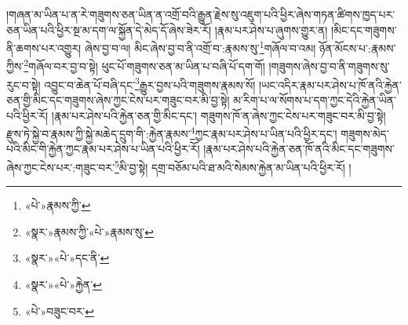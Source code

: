 །གཞན་མ་ཡིན་པ་ན་རེ་གཟུགས་ཅན་ཡིན་ན་འགྲོ་བའི་རྒྱུན་རྗེས་སུ་འཇུག་པའི་ཕྱིར་ཞེས་གཏན་ཚིགས་ཁྱད་པར་ཅན་ཡིན་པའི་ཕྱིར་སྔ་མ་དག་ལ་སྐྱོན་དེ་མེད་དོ་ཞེས་ཟེར་རོ། །རྣམ་པར་ཤེས་པ་ཞུགས་གྱུར་ན། །མིང་དང་གཟུགས་ནི་ཆགས་པར་འགྱུར། ཞེས་བྱ་བ་ལ། མིང་ཞེས་བྱ་བ་ནི་འགྲོ་བ་:རྣམས་སུ་\footnote{«པེ་»རྣམས་ཀྱི་}གཞོལ་བ་འམ། ཉོན་མོངས་པ་:རྣམས་ཀྱིས་\footnote{«སྣར་»རྣམས་ཀྱི་«པེ་»རྣམས་སུ་}གཞོལ་བར་བྱ་བ་སྟེ། ཕུང་པོ་གཟུགས་ཅན་མ་ཡིན་པ་བཞི་པོ་དག་གོ། །གཟུགས་ཞེས་བྱ་བ་ནི་གཟུགས་སུ་རུང་བ་སྟེ། འབྱུང་བ་ཆེན་པོ་བཞི་དང་\footnote{«སྣར་»«པེ་»དང་ནི་}རྒྱུར་བྱས་པའི་གཟུགས་རྣམས་སོ། །ཡང་འདིར་རྣམ་པར་ཤེས་པ་ཁོ་ནའི་རྐྱེན་ཅན་གྱི་མིང་དང་གཟུགས་ཞེས་ཀྱང་ངེས་པར་གཟུང་བར་མི་བྱ་སྟེ། མ་རིག་པ་ལ་སོགས་པ་དག་ཀྱང་དེའི་རྐྱེན་ཡིན་པའི་ཕྱིར་རོ། །རྣམ་པར་ཤེས་པའི་རྐྱེན་ཅན་གྱི་མིང་དང་། གཟུགས་ཁོ་ན་ཞེས་ཀྱང་ངེས་པར་གཟུང་བར་མི་བྱ་སྟེ། རྫུས་ཏེ་སྐྱེ་བ་རྣམས་ཀྱི་སྐྱེ་མཆེད་དྲུག་གི་:རྐྱེན་རྣམས་\footnote{«སྣར་»«པེ་»རྐྱེན་}ཀྱང་རྣམ་པར་ཤེས་པ་ཡིན་པའི་ཕྱིར་དང་། གཟུགས་མེད་པའི་མིང་གི་རྐྱེན་ཀྱང་རྣམ་པར་ཤེས་པ་ཡིན་པའི་ཕྱིར་རོ། །རྣམ་པར་ཤེས་པའི་རྐྱེན་ཅན་ཁོ་ནའི་མིང་དང་གཟུགས་ཞེས་ཀྱང་ངེས་པར་:གཟུང་བར་\footnote{«པེ་»བཟུང་བར་}མི་བྱ་སྟེ། དགྲ་བཅོམ་པའི་ཐ་མའི་སེམས་རྐྱེན་མ་ཡིན་པའི་ཕྱིར་རོ། །
